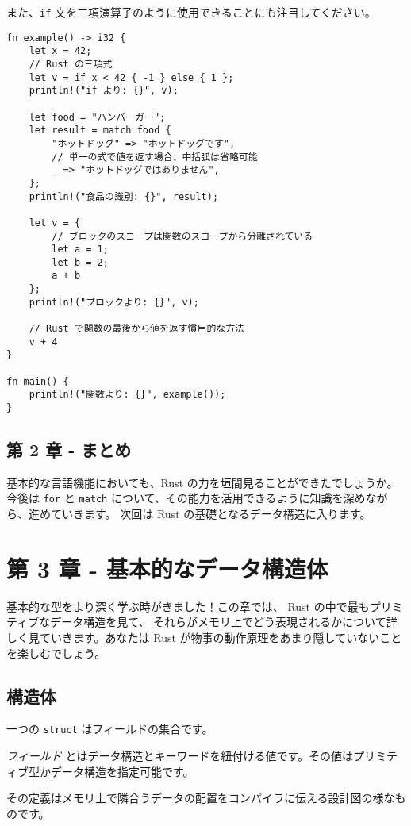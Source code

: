 また、\texttt{if}
文を三項演算子のように使用できることにも注目してください。

\begin{verbatim}
fn example() -> i32 {
    let x = 42;
    // Rust の三項式
    let v = if x < 42 { -1 } else { 1 };
    println!("if より: {}", v);

    let food = "ハンバーガー";
    let result = match food {
        "ホットドッグ" => "ホットドッグです",
        // 単一の式で値を返す場合、中括弧は省略可能
        _ => "ホットドッグではありません",
    };
    println!("食品の識別: {}", result);

    let v = {
        // ブロックのスコープは関数のスコープから分離されている
        let a = 1;
        let b = 2;
        a + b
    };
    println!("ブロックより: {}", v);

    // Rust で関数の最後から値を返す慣用的な方法
    v + 4
}

fn main() {
    println!("関数より: {}", example());
}
\end{verbatim}

\subsection{第 2 章 -
まとめ}

基本的な言語機能においても、Rust の力を垣間見ることができたでしょうか。
今後は \texttt{for} と \texttt{match}
について、その能力を活用できるように知識を深めながら、進めていきます。
次回は Rust の基礎となるデータ構造に入ります。

\section{第 3 章 -
基本的なデータ構造体}

基本的な型をより深く学ぶ時がきました！この章では、 Rust
の中で最もプリミティブなデータ構造を見て、
それらがメモリ上でどう表現されるかについて詳しく見ていきます。あなたは
Rust が物事の動作原理をあまり隠していないことを楽しむでしょう。

\subsection{構造体}

一つの \texttt{struct} はフィールドの集合です。

\emph{フィールド}
とはデータ構造とキーワードを紐付ける値です。その値はプリミティブ型かデータ構造を指定可能です。

その定義はメモリ上で隣合うデータの配置をコンパイラに伝える設計図の様なものです。

